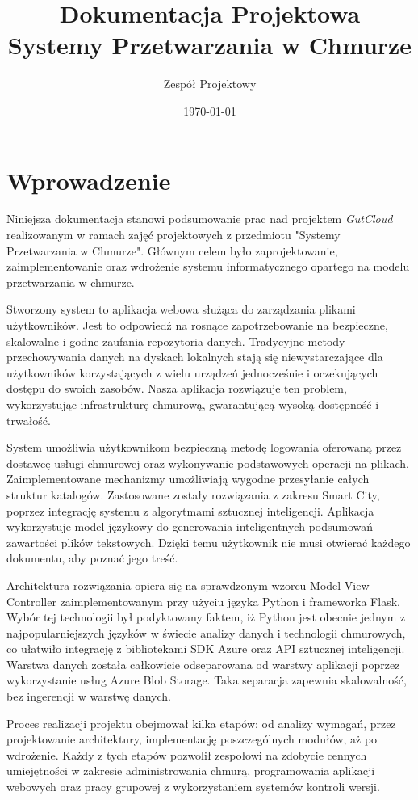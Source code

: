 \documentclass[12pt,a4paper]{article}
\title{\textbf{Dokumentacja Projektowa}\\Systemy Przetwarzania w Chmurze}
\author{Zespół Projektowy}
\date{\today}
\begin{document}
	
	\maketitle
	\tableofcontents
	\newpage
	
	\section{Wprowadzenie}
	Niniejsza dokumentacja stanowi podsumowanie prac nad projektem \textit{GutCloud} realizowanym w ramach zajęć projektowych z przedmiotu "Systemy Przetwarzania w Chmurze". Głównym celem było zaprojektowanie, zaimplementowanie oraz wdrożenie systemu informatycznego opartego na modelu przetwarzania w chmurze.
	
	Stworzony system to aplikacja webowa służąca do zarządzania plikami użytkowników. Jest to odpowiedź na rosnące zapotrzebowanie na bezpieczne, skalowalne i godne zaufania repozytoria danych. Tradycyjne metody przechowywania danych na dyskach lokalnych stają się niewystarczające dla użytkowników korzystających z wielu urządzeń jednocześnie i oczekujących dostępu do swoich zasobów. Nasza aplikacja rozwiązuje ten problem, wykorzystując infrastrukturę chmurową, gwarantującą wysoką dostępność i trwałość.
	
	System umożliwia użytkownikom bezpieczną metodę logowania oferowaną przez dostawcę usługi chmurowej oraz wykonywanie podstawowych operacji na plikach. Zaimplementowane mechanizmy umożliwiają wygodne przesyłanie całych struktur katalogów. Zastosowane zostały rozwiązania z zakresu Smart City, poprzez integrację systemu z algorytmami sztucznej inteligencji. Aplikacja wykorzystuje model językowy do generowania inteligentnych podsumowań zawartości plików tekstowych. Dzięki temu użytkownik nie musi otwierać każdego dokumentu, aby poznać jego treść.
	
	Architektura rozwiązania opiera się na sprawdzonym wzorcu Model-View-Controller zaimplementowanym przy użyciu języka Python i frameworka Flask. Wybór tej technologii był podyktowany faktem, iż Python jest obecnie jednym z najpopularniejszych języków w świecie analizy danych i technologii chmurowych, co ułatwiło integrację z bibliotekami SDK Azure oraz API sztucznej inteligencji. Warstwa danych została całkowicie odseparowana od warstwy aplikacji poprzez wykorzystanie usług Azure Blob Storage. Taka separacja zapewnia skalowalność, bez ingerencji w warstwę danych.
	
	Proces realizacji projektu obejmował kilka etapów: od analizy wymagań, przez projektowanie architektury, implementację poszczególnych modułów, aż po wdrożenie. Każdy z tych etapów pozwolił zespołowi na zdobycie cennych umiejętności w zakresie administrowania chmurą, programowania aplikacji webowych oraz pracy grupowej z wykorzystaniem systemów kontroli wersji.
	
\end{document}
